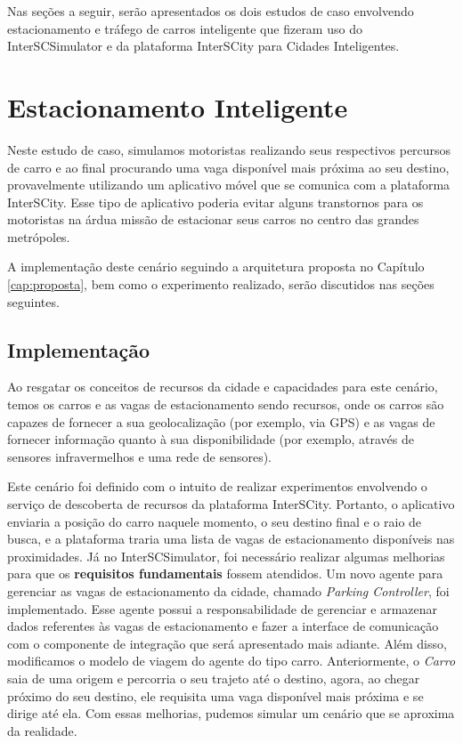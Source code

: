 Nas seções a seguir, serão apresentados os dois estudos de caso envolvendo estacionamento e tráfego de carros inteligente que fizeram uso do InterSCSimulator e da plataforma InterSCity
para Cidades Inteligentes.

\section{Estacionamento Inteligente}

Neste estudo de caso, simulamos motoristas realizando seus respectivos percursos de carro e ao final procurando uma vaga disponível mais próxima ao
seu destino, provavelmente utilizando um aplicativo móvel que se comunica com a plataforma InterSCity.
Esse tipo de aplicativo poderia evitar alguns transtornos para os motoristas na árdua missão de estacionar seus carros no centro das grandes metrópoles.

A implementação deste cenário seguindo a arquitetura proposta no Capítulo \ref{cap:proposta}, bem como o experimento realizado, serão discutidos nas seções seguintes.

\subsection{Implementação}
\label{sec:smart_parking}

Ao resgatar os conceitos de recursos da cidade e capacidades para este cenário, temos os carros e as vagas de estacionamento sendo recursos, onde os carros são capazes de
fornecer a sua geolocalização (por exemplo, via GPS) e as vagas de fornecer informação quanto à sua disponibilidade (por exemplo, através de sensores infravermelhos e uma
rede de sensores).

Este cenário foi definido com o intuito de realizar experimentos envolvendo o serviço de descoberta de recursos da plataforma InterSCity.
Portanto, o aplicativo enviaria a posição do carro naquele momento, o seu destino final e o raio de busca, e a plataforma traria uma lista de vagas de estacionamento
disponíveis nas proximidades.
Já no InterSCSimulator, foi necessário realizar algumas melhorias para que os \textbf{requisitos fundamentais} fossem atendidos.
Um novo agente para gerenciar as vagas de estacionamento da cidade, chamado \textit{Parking Controller}, foi implementado.
Esse agente possui a responsabilidade de gerenciar e armazenar dados referentes às vagas de estacionamento e fazer a interface de comunicação com o componente de
integração que será apresentado mais adiante.
Além disso, modificamos o modelo de viagem do agente do tipo carro.
Anteriormente, o \textit{Carro} saia de uma origem e percorria o seu trajeto até o destino, agora, ao chegar próximo do seu destino, ele requisita uma vaga disponível mais
próxima e se dirige até ela.
Com essas melhorias, pudemos simular um cenário que se aproxima da realidade.

